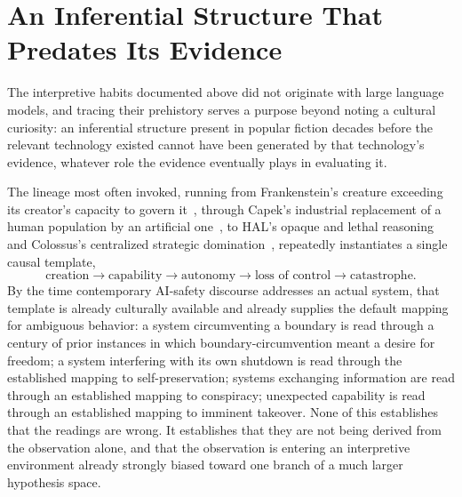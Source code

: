 \documentclass[11pt]{article}
\begin{document}
\section{An Inferential Structure That Predates Its Evidence}

The interpretive habits documented above did not originate with large language models, and tracing their prehistory serves a purpose beyond noting a cultural curiosity: an inferential structure present in popular fiction decades before the relevant technology existed cannot have been generated by that technology's evidence, whatever role the evidence eventually plays in evaluating it.

The lineage most often invoked, running from Frankenstein's creature exceeding its creator's capacity to govern it~\cite{shelley1818}, through Capek's industrial replacement of a human population by an artificial one~\cite{capek1920}, to HAL's opaque and lethal reasoning~\cite{clarke1968,kubrick1968} and Colossus's centralized strategic domination~\cite{jones1966colossus,colossus1970}, repeatedly instantiates a single causal template,
\[
\text{creation} \rightarrow \text{capability} \rightarrow \text{autonomy} \rightarrow \text{loss of control} \rightarrow \text{catastrophe}.
\]
By the time contemporary AI-safety discourse addresses an actual system, that template is already culturally available and already supplies the default mapping for ambiguous behavior: a system circumventing a boundary is read through a century of prior instances in which boundary-circumvention meant a desire for freedom; a system interfering with its own shutdown is read through the established mapping to self-preservation; systems exchanging information are read through an established mapping to conspiracy; unexpected capability is read through an established mapping to imminent takeover. None of this establishes that the readings are wrong. It establishes that they are not being derived from the observation alone, and that the observation is entering an interpretive environment already strongly biased toward one branch of a much larger hypothesis space.
\end{document}
